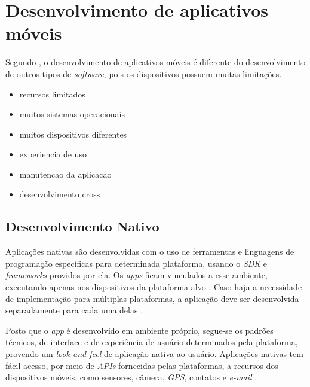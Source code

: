\chapter{Desenvolvimento de aplicativos móveis} \label{cap:referencialteorico} 

Segundo , o desenvolvimento de aplicativos móveis é diferente do desenvolvimento de outros tipos de \textit{software}, pois os dispositivos possuem muitas limitações.


\begin{itemize}
    \item recursos limitados
    \item muitos sistemas operacionais
    \item muitos dispositivos diferentes
    \item experiencia de uso
    \item manutencao da aplicacao
    \item desenvolvimento cross
\end{itemize}

\section{Desenvolvimento Nativo} \label{section:desenvolvimentonativo}

Aplicações nativas são desenvolvidas com o uso de ferramentas e linguagens de programação específicas para determinada plataforma, 
usando o \textit{SDK} e \textit{frameworks} providos por ela. Os \textit{apps} ficam vinculados a esse ambiente, executando apenas 
nos dispositivos da plataforma alvo \cite{kassas_taxonomy_2015}. Caso haja a necessidade de implementação para múltiplas plataformas, 
a aplicação deve ser desenvolvida separadamente para cada uma delas \cite{heitkotter_evaluating_2013}.

Posto que o \textit{app} é desenvolvido em ambiente próprio, segue-se os padrões técnicos, de interface e de experiência de usuário determinados pela plataforma, provendo um \textit{look and feel} de aplicação nativa ao usuário.
Aplicações nativas tem fácil acesso, por meio de \textit{APIs} fornecidas pelas plataformas, a recursos dos dispositivos móveis, como sensores, câmera, \textit{GPS}, contatos e \textit{e-mail} \cite{kassas_taxonomy_2015}.

